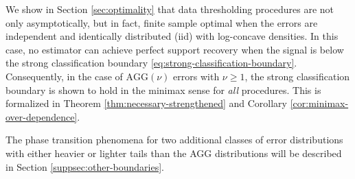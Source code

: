 

\medskip

We show in Section \ref{sec:optimality} that data thresholding procedures are not only asymptotically, but in fact, finite sample optimal when the errors are independent and identically distributed (iid) with log-concave densities. 
In this case, no estimator can achieve perfect support recovery when the signal is below the strong classification boundary \eqref{eq:strong-classification-boundary}.  
Consequently, in the case of $\text{AGG}(\nu)$ errors with $\nu\ge 1$, the strong 
classification boundary is shown to hold in the minimax 
sense for \emph{all} procedures. This is formalized in Theorem \ref{thm:necessary-strengthened} and Corollary \ref{cor:minimax-over-dependence}. 

\medskip
The phase transition phenomena for two additional classes of error distributions with either heavier or lighter tails than the AGG distributions will be described in Section \ref{suppsec:other-boundaries}.

